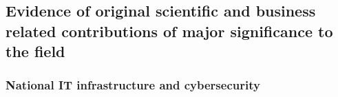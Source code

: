 


\subsection{Evidence of \mrls original scientific and business related contributions of major significance to the field}
\label{subsec:Contributions}


\subsubsection{National IT infrastructure and cybersecurity}

